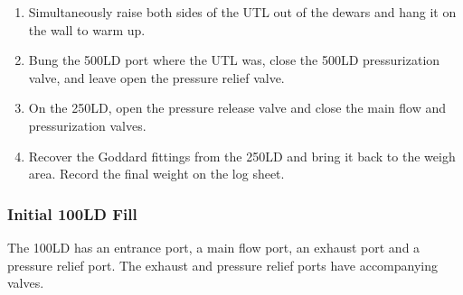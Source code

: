 \begin{enumerate}
 \item Simultaneously raise both sides of the UTL out of the dewars and hang it on the wall to warm up.
 \item Bung the 500LD port where the UTL was, close the 500LD pressurization valve, and leave open the pressure relief valve.
 \item On the 250LD, open the pressure release valve and close the main flow and pressurization valves.
 \item Recover the Goddard fittings from the 250LD and bring it back to the weigh area.  Record the final weight on the log sheet.
\end{enumerate}

\subsubsection{Initial 100LD Fill}

The 100LD has an entrance port, a main flow port, an exhaust port and a pressure relief port.  The exhaust and pressure relief ports have accompanying valves.
 

